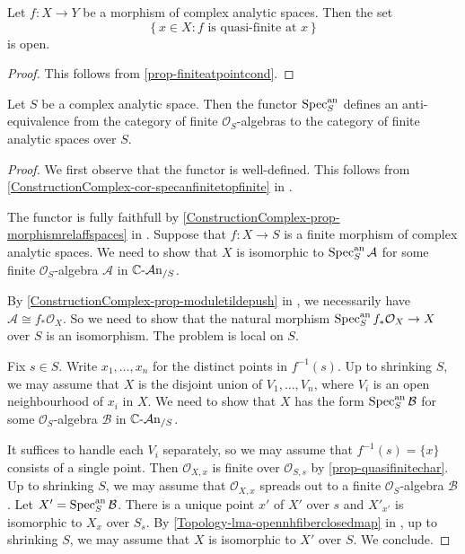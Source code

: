 \begin{corollary}
    Let $f:X\rightarrow Y$ be a morphism of complex analytic spaces. Then the set
    \[
        \left\{ x\in X: f\text{ is quasi-finite at }x\right\}  
    \]
    is open.
\end{corollary}
\begin{proof}
    This follows from \cref{prop-finiteatpointcond}.
\end{proof}



\begin{thm}\label{thm-finitealgeqfiniteanalyticspace}
    Let $S$ be a complex analytic space. Then the functor $\operatorname{Spec}^{\mathrm{an}}_S$ defines an anti-equivalence from the category of finite $\mathcal{O}_S$-algebras to the category of finite analytic spaces over $S$.
\end{thm}
\begin{proof}
    We first observe that the functor is well-defined. This follows from \cref{ConstructionComplex-cor-specanfinitetopfinite} in .

    The functor is fully faithfull by \cref{ConstructionComplex-prop-morphismrelaffspaces} in . Suppose that $f:X\rightarrow S$ is a finite morphism of complex analytic spaces. We need to show that $X$ is isomorphic to $\operatorname{Spec}^{\mathrm{an}}_{S}\mathcal{A}$ for some finite $\mathcal{O}_S$-algebra $\mathcal{A}$ in $\mathbb{C}\text{-}\mathcal{A}\mathrm{n}_{/S}$.

    By \cref{ConstructionComplex-prop-moduletildepush} in , we necessarily have $\mathcal{A}\cong f_*\mathcal{O}_X$. So we need to show that the natural morphism $\operatorname{Spec}_S^{\mathrm{an}} f_*\mathcal{O}_X\rightarrow X$ over $S$ is an isomorphism. The problem is local on $S$. 

    Fix $s\in S$. Write $x_1,\ldots,x_n$ for the distinct points in $f^{-1}(s)$.
    Up to shrinking $S$, we may assume that $X$ is the disjoint union of $V_1,\ldots,V_n$, where $V_i$ is an open neighbourhood of $x_i$ in $X$. 
    We need to show that $X$ has the form $\operatorname{Spec}^{\mathrm{an}}_S \mathcal{B}$ for some $\mathcal{O}_S$-algebra $\mathcal{B}$ in $\mathbb{C}\text{-}\mathcal{A}\mathrm{n}_{/S}$.

    It suffices to handle each $V_i$ separately, so we may assume that $f^{-1}(s)=\{x\}$ consists of a single point. Then $\mathcal{O}_{X,x}$ is finite over $\mathcal{O}_{S,s}$ by \cref{prop-quasifinitechar}. Up to shrinking $S$, we may assume that $\mathcal{O}_{X,x}$ spreads out to a finite $\mathcal{O}_S$-algebra $\mathcal{B}$. Let $X'=\operatorname{Spec}^{\mathrm{an}}_{S}\mathcal{B}$. There is a unique point $x'$ of $X'$ over $s$ and $X'_{x'}$ is isomorphic to $X_x$ over $S_s$. By \cref{Topology-lma-opennhfiberclosedmap} in , up to shrinking $S$, we may assume that $X$ is isomorphic to $X'$ over $S$. We conclude.
\end{proof}

